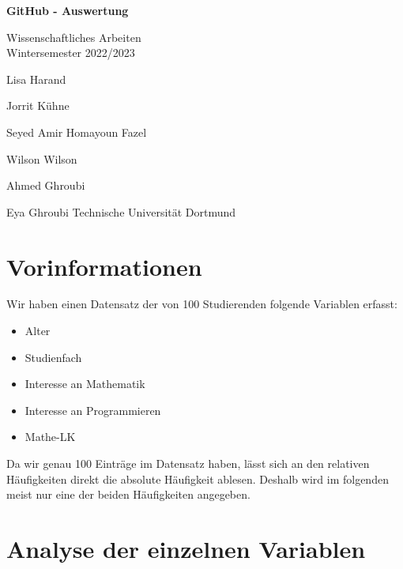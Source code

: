 \documentclass[paper=a4,                 %
               fontsize=12pt,            %
               parskip=half,             %
               ngerman,                 %
               ]{scrartcl}
\begin{document}
\begin{titlepage}
    \begin{center}
        \vspace*{3cm}
            
        \Huge
        \textbf{GitHub - Auswertung}
            
        \vspace{0.5cm}
        \LARGE
        Wissenschaftliches Arbeiten\\ 
        \Large
        Wintersemester 2022/2023
        \vspace{2cm}      
           
        Lisa Harand 
        
		Jorrit Kühne
		
		Seyed Amir Homayoun Fazel 
		
		Wilson Wilson
		
		Ahmed Ghroubi 
		
		Eya Ghroubi 
        \vfill    
        \vspace{0.8cm} 
        \Large
        Technische Universität Dortmund\\
            
    \end{center}
\end{titlepage}

\tableofcontents

\newpage
\section{Vorinformationen}
Wir haben einen Datensatz der von 100 Studierenden folgende Variablen erfasst:
\begin{itemize}
\item Alter
\item Studienfach
\item Interesse an Mathematik
\item Interesse an Programmieren
\item Mathe-LK
\end{itemize}

Da wir genau 100 Einträge im Datensatz haben, lässt sich an den relativen Häufigkeiten 
direkt die absolute Häufigkeit ablesen. 
Deshalb wird im folgenden meist nur eine der beiden Häufigkeiten angegeben.
\newpage
\section{Analyse der einzelnen Variablen}
\end{document}

